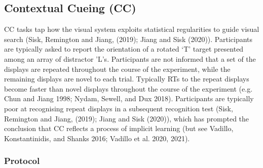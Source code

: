 \documentclass{article}
\begin{document}
\hypertarget{contextual-cueing-cc}{%
\subsection{Contextual Cueing (CC)}\label{contextual-cueing-cc}}

\label{sec:CCMeth}

CC tasks tap how the visual system exploits statistical regularities to guide visual search (Sisk, Remington and Jiang, (2019); Jiang and Sisk (2020)). Participants are typically asked to report the orientation of a rotated `T' target presented among an array of distractor 'L's. Participants are not informed that a set of the displays are repeated throughout the course of the experiment, while the remaining displays are novel to each trial. Typically RTs to the repeat displays become faster than novel displays throughout the course of the experiment (e.g. Chun and Jiang 1998; Nydam, Sewell, and Dux 2018). Participants are typically poor at recognising repeat displays in a subsequent recognition test (Sisk, Remington and Jiang, (2019); Jiang and Sisk (2020)), which has prompted the conclusion that CC reflects a process of implicit learning (but see Vadillo, Konstantinidis, and Shanks 2016; Vadillo et al. 2020, 2021).

\hypertarget{protocol-2}{%
\subsubsection{Protocol}\label{protocol-2}}
\end{document}
